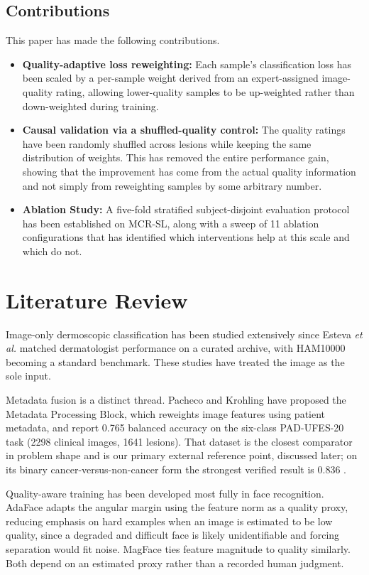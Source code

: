\documentclass[conference]{IEEEtran}
\begin{document}
\subsection{Contributions}
This paper has made the following contributions.
\begin{itemize}
\item \textbf{Quality-adaptive loss reweighting:} Each sample's classification loss has been scaled by a per-sample weight derived from an expert-assigned image-quality rating, allowing lower-quality samples to be up-weighted rather than down-weighted during training.
\item \textbf{Causal validation via a shuffled-quality control:} The quality ratings have been randomly shuffled across lesions while keeping the same distribution of weights. This has removed the entire performance gain, showing that the improvement has come from the actual quality information and not simply from reweighting samples by some arbitrary number.
\item \textbf{Ablation Study:} A five-fold stratified subject-disjoint evaluation protocol has been established on MCR-SL, along with a sweep of 11 ablation configurations that has identified which interventions help at this scale and which do not.
\end{itemize}
\section{Literature Review} %
\label{sec:lit}
Image-only dermoscopic classification has been studied extensively since Esteva \emph{et al.} \cite{esteva2017} matched dermatologist performance on a curated archive, with HAM10000 \cite{ham10000} becoming a standard benchmark. These studies have treated the image as the sole input.

Metadata fusion is a distinct thread. Pacheco and Krohling \cite{metablock} have proposed the Metadata Processing Block, which reweights image features using patient metadata, and report 0.765 balanced accuracy on the six-class PAD-UFES-20 task \cite{paduf20} (2298 clinical images, 1641 lesions). That dataset is the closest comparator in problem shape and is our primary external reference point, discussed later; on its binary cancer-versus-non-cancer form the strongest verified result is 0.836 \cite{diffmic}.

Quality-aware training has been developed most fully in face recognition. AdaFace \cite{adaface} adapts the angular margin using the feature norm as a quality proxy, reducing emphasis on hard examples when an image is estimated to be low quality, since a degraded and difficult face is likely unidentifiable and forcing separation would fit noise. MagFace \cite{magface} ties feature magnitude to quality similarly. Both depend on an estimated proxy rather than a recorded human judgment.
\end{document}
